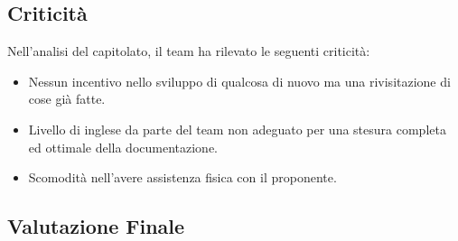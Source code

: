 \subsection{Criticità}
Nell’analisi del capitolato, il team ha rilevato le seguenti criticità:
\begin{itemize}
	\item Nessun incentivo nello sviluppo di qualcosa di nuovo ma una rivisitazione di cose già fatte. 
	\item Livello di inglese da parte del team non adeguato per una stesura completa ed ottimale della documentazione. 	
	\item Scomodità nell'avere assistenza fisica con il proponente.
\end{itemize}

\subsection{Valutazione Finale}
